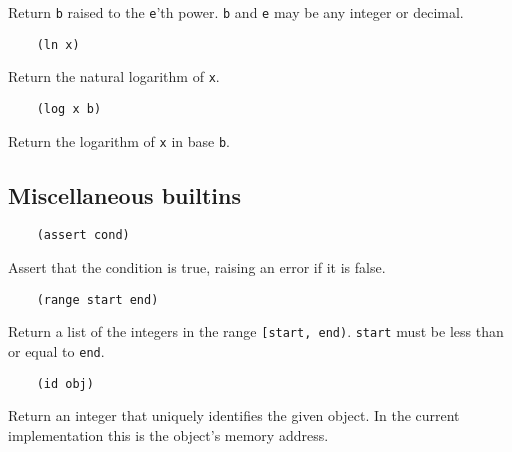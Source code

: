 \documentclass{article}
\newcommand{\inlinecode}{\texttt}
\begin{document}
Return \inlinecode{b} raised to the \inlinecode{e}'th power. \inlinecode{b} and \inlinecode{e} may be any integer or decimal.

\begin{verbatim}
    (ln x)
\end{verbatim}

Return the natural logarithm of \inlinecode{x}.

\begin{verbatim}
    (log x b)
\end{verbatim}

Return the logarithm of \inlinecode{x} in base \inlinecode{b}.

\subsection{Miscellaneous builtins}
\begin{verbatim}
    (assert cond)
\end{verbatim}

Assert that the condition is true, raising an error if it is false.

\begin{verbatim}
    (range start end)
\end{verbatim}

Return a list of the integers in the range \inlinecode{[start, end)}. \inlinecode{start} must be less than or equal to \inlinecode{end}.

\begin{verbatim}
    (id obj)
\end{verbatim}

Return an integer that uniquely identifies the given object. In the current implementation this is the object's memory address.
\end{document}
